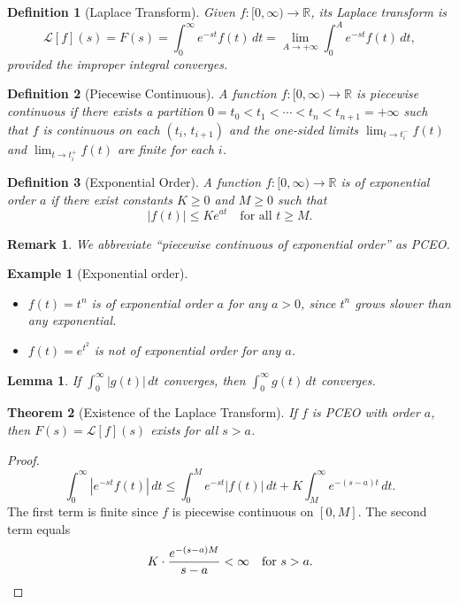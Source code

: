 \documentclass{article}
\newtheorem{theorem}{Theorem}
\newtheorem{lemma}[theorem]{Lemma}
\newtheorem{definition}{Definition}
\newtheorem*{example}{Example}
\newtheorem{remark}{Remark}
\newcommand{\Lap}{\mathcal{L}}
\newcommand{\R}{\mathbb{R}}
\begin{document}
\begin{definition}[Laplace Transform]
    Given $f: [0,\infty) \to \R$, its Laplace transform is
    \[\Lap[f](s) = F(s) = \int_0^\infty e^{-st} f(t)\,dt = \lim_{A\to+\infty} \int_0^A e^{-st} f(t)\,dt,\]
    provided the improper integral converges.
\end{definition}

\begin{definition}[Piecewise Continuous]
    A function $f: [0,\infty)\to\R$ is piecewise continuous if there exists a partition
    $0 = t_0 < t_1 < \cdots < t_n < t_{n+1} = +\infty$
    such that $f$ is continuous on each $(t_i,\,t_{i+1})$ and the one-sided limits
    $\lim_{t\to t_i^-} f(t)$ and $\lim_{t\to t_i^+} f(t)$ are finite for each $i$.
\end{definition}

\begin{definition}[Exponential Order]
    A function $f:[0,\infty)\to\R$ is of exponential order $a$ if there exist constants $K\geq 0$ and $M\geq 0$ such that
    \[|f(t)| \leq K e^{at} \quad \text{for all } t \geq M.\]
\end{definition}

\begin{remark}
    We abbreviate ``piecewise continuous of exponential order'' as PCEO.
\end{remark}

\begin{example}[Exponential order]
    \begin{itemize}[nosep]
        \item $f(t) = t^n$ is of exponential order $a$ for any $a > 0$, since $t^n$ grows slower than any exponential.
        \item $f(t) = e^{t^2}$ is not of exponential order for any $a$.
    \end{itemize}
\end{example}

\begin{lemma}
    If $\int_0^\infty |g(t)|\,dt$ converges, then $\int_0^\infty g(t)\,dt$ converges.
\end{lemma}

\begin{theorem}[Existence of the Laplace Transform]
    If $f$ is PCEO with order $a$, then $F(s) = \Lap[f](s)$ exists for all $s > a$.
\end{theorem}

\begin{proof}
    \[\int_0^\infty |e^{-st} f(t)|\,dt \leq \int_0^M e^{-st}|f(t)|\,dt + K\int_M^\infty e^{-(s-a)t}\,dt.\]
    The first term is finite since $f$ is piecewise continuous on $[0,M]$. The second term equals
    \[K\cdot\frac{e^{-(s-a)M}}{s-a} < \infty \quad\text{for } s > a. \qedhere\]
\end{proof}
\end{document}
